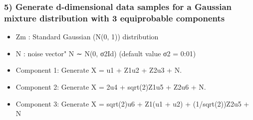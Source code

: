 \documentclass[11pt]{article}
\providecommand{\tightlist}{%
      \setlength{\itemsep}{0pt}\setlength{\parskip}{0pt}}
\begin{document}
    \subsubsection{5) Generate d-dimensional data samples for a Gaussian
mixture distribution with 3 equiprobable
components}\label{generate-d-dimensional-data-samples-for-a-gaussian-mixture-distribution-with-3-equiprobable-components}

\begin{itemize}
\tightlist
\item
  Zm : Standard Gaussian (N(0, 1)) distribution
\item
  N : noise vector" N ∼ N(0, σ2Id) (default value σ2 = 0:01)
\item
  Component 1: Generate X = u1 + Z1u2 + Z2u3 + N.
\item
  Component 2: Generate X = 2u4 + sqrt(2)Z1u5 + Z2u6 + N.
\item
  Component 3: Generate X = sqrt(2)u6 + Z1(u1 + u2) + (1/sqrt(2))Z2u5 +
  N
\end{itemize}
\end{document}
